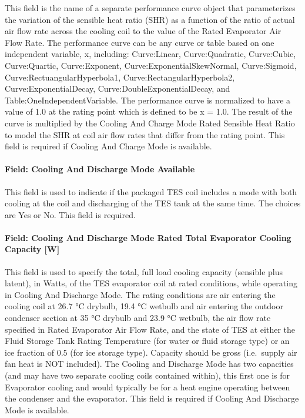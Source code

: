 This field is the name of a separate performance curve object that parameterizes the variation of the sensible heat ratio (SHR) as a function of the ratio of actual air flow rate across the cooling coil to the value of the Rated Evaporator Air Flow Rate. The performance curve can be any curve or table based on one independent variable, x, including: Curve:Linear, Curve:Quadratic, Curve:Cubic, Curve:Quartic, Curve:Exponent, Curve:ExponentialSkewNormal, Curve:Sigmoid, Curve:RectuangularHyperbola1, Curve:RectangularHyperbola2, Curve:ExponentialDecay, Curve:DoubleExponentialDecay, and Table:OneIndependentVariable. The performance curve is normalized to have a value of 1.0 at the rating point which is defined to be x = 1.0. The result of the curve is multiplied by the Cooling And Charge Mode Rated Sensible Heat Ratio to model the SHR at coil air flow rates that differ from the rating point. This field is required if Cooling And Charge Mode is available.

\paragraph{Field: Cooling And Discharge Mode Available}\label{field-cooling-and-discharge-mode-available}

This field is used to indicate if the packaged TES coil includes a mode with both cooling at the coil and discharging of the TES tank at the same time. The choices are Yes or No. This field is required.

\paragraph{Field: Cooling And Discharge Mode Rated Total Evaporator Cooling Capacity {[}W{]}}\label{field-cooling-and-discharge-mode-rated-total-evaporator-cooling-capacity-w}

This field is used to specify the total, full load cooling capacity (sensible plus latent), in Watts, of the TES evaporator coil at rated conditions, while operating in Cooling And Discharge Mode. The rating conditions are air entering the cooling coil at 26.7 °C drybulb, 19.4 °C wetbulb and air entering the outdoor condenser section at 35 °C drybulb and 23.9 °C wetbulb, the air flow rate specified in Rated Evaporator Air Flow Rate, and the state of TES at either the Fluid Storage Tank Rating Temperature (for water or fluid storage type) or an ice fraction of 0.5 (for ice storage type). Capacity should be gross (i.e.~supply air fan heat is NOT included). The Cooling and Discharge Mode has two capacities (and may have two separate cooling coils contained within), this first one is for Evaporator cooling and would typically be for a heat engine operating between the condenser and the evaporator. This field is required if Cooling And Discharge Mode is available.

